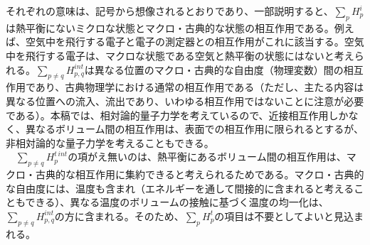 それぞれの意味は、記号から想像されるとおりであり、一部説明すると、$\sum_p H_p^i$は熱平衡にないミクロな状態とマクロ・古典的な状態の相互作用である。例えば、空気中を飛行する電子と電子の測定器との相互作用がこれに該当する。空気中を飛行する電子は、マクロな状態である空気と熱平衡の状態にはないと考えられる。$\sum_{p \neq q}H^{int}_{p,q}$は異なる位置のマクロ・古典的な自由度（物理変数）間の相互作用であり、古典物理学における通常の相互作用である（ただし、主たる内容は異なる位置への流入、流出であり、いわゆる相互作用ではないことに注意が必要である）。本稿では、相対論的量子力学を考えているので、近接相互作用しかなく、異なるボリューム間の相互作用は、表面での相互作用に限られるとするが、非相対論的な量子力学を考えることもできる。\\
　$\sum_{p \neq q} H_p^{t\,int}$の項がえ無いのは、熱平衡にあるボリューム間の相互作用は、マクロ・古典的な相互作用に集約できると考えられるためである。マクロ・古典的な自由度には、温度も含まれ（エネルギーを通して間接的に含まれると考えることもできる）、異なる温度のボリュームの接触に基づく温度の均一化は、$\sum_{p \neq q} H^{int}_{p,q}$の方に含まれる。そのため、$\sum_pH_p^t$の項目は不要としてよいと見込まれる。
